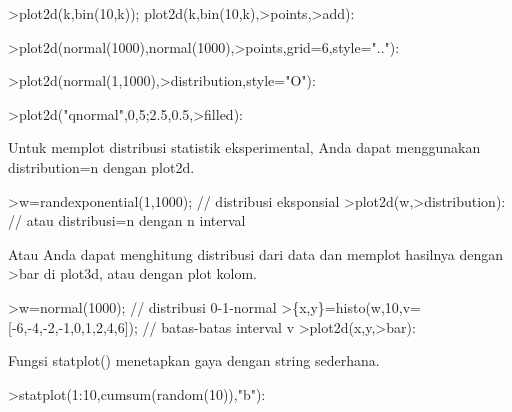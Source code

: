 \documentclass[12pt,Times new roman,letterpaper]{book}
\begin{document}
\begin{eulernootebook}
\begin{eulercomment}
\begin{eulercomment}
\begin{eulernootebook}
\begin{eulercomment}
\begin{eulercomment}
\begin{eulercomment}
\begin{eulercomment}
\begin{eulercomment}
\begin{eulercomment}
\begin{eulercomment}
\begin{eulernotebook}
\begin{eulercomment}
\begin{eulercomment}
\begin{eulercomment}
\begin{eulercomment}
\begin{eulerprompt}
>plot2d(k,bin(10,k)); plot2d(k,bin(10,k),>points,>add):
\end{eulerprompt}
\begin{eulerprompt}
>plot2d(normal(1000),normal(1000),>points,grid=6,style=".."):
\end{eulerprompt}
\begin{eulerprompt}
>plot2d(normal(1,1000),>distribution,style="O"):
\end{eulerprompt}
\begin{eulerprompt}
>plot2d("qnormal",0,5;2.5,0.5,>filled):
\end{eulerprompt}
\begin{eulercomment}
Untuk memplot distribusi statistik eksperimental, Anda dapat
menggunakan distribution=n dengan plot2d.
\end{eulercomment}
\begin{eulerprompt}
>w=randexponential(1,1000); // distribusi eksponsial
>plot2d(w,>distribution): // atau distribusi=n dengan n interval 
\end{eulerprompt}
\begin{eulercomment}
Atau Anda dapat menghitung distribusi dari data dan memplot hasilnya
dengan \textgreater{}bar di plot3d, atau dengan plot kolom.
\end{eulercomment}
\begin{eulerprompt}
>w=normal(1000); // distribusi 0-1-normal
>\{x,y\}=histo(w,10,v=[-6,-4,-2,-1,0,1,2,4,6]); // batas-batas interval v
>plot2d(x,y,>bar):
\end{eulerprompt}
\begin{eulercomment}
Fungsi statplot() menetapkan gaya dengan string sederhana.
\end{eulercomment}
\begin{eulerprompt}
>statplot(1:10,cumsum(random(10)),"b"):
\end{eulerprompt}

\end{eulercomment}
\end{eulercomment}
\end{eulercomment}
\end{eulercomment}
\end{eulernotebook}
\end{eulercomment}
\end{eulercomment}
\end{eulercomment}
\end{eulercomment}
\end{eulercomment}
\end{eulercomment}
\end{eulercomment}
\end{eulernootebook}
\end{eulercomment}
\end{eulercomment}
\end{eulernootebook}
\end{document}

